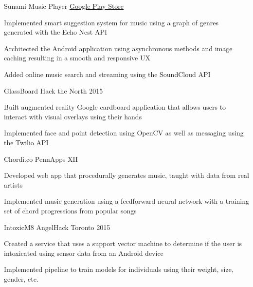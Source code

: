 \begin{cvprojects}
  \cvproject
    {Sunami Music Player}
    {\href{http://play.google.com/store/apps/details?id=com.wojtechnology.sunami}{Google Play Store}}
    {
      \begin{cvitems}
        \item Implemented smart suggestion system for music using a graph of genres generated with the Echo Nest API
        \item Architected the Android application using asynchronous methods and image caching resulting in a smooth and responsive UX
        \item Added online music search and streaming using the SoundCloud API
      \end{cvitems}
    }
  \cvproject
    {GlassBoard}
    {Hack the North 2015}
    {
      \begin{cvitems}
        \item Built augmented reality Google cardboard application that allows users to interact with visual overlays using their hands
        \item Implemented face and point detection using OpenCV as well as messaging using the Twilio API
      \end{cvitems}
    }
  \cvproject
    {Chordi.co}
    {PennApps XII}
    {
      \begin{cvitems}
        \item Developed web app that procedurally generates music, taught with data from real artists
        \item Implemented music generation using a feedforward neural network with a training set of chord progressions from popular songs
      \end{cvitems}
    }
  \cvproject
    {IntoxicM8}
    {AngelHack Toronto 2015}
    {
      \begin{cvitems}
        \item Created a service that uses a support vector machine to determine if the user is intoxicated using sensor data from an Android device
        \item Implemented pipeline to train models for individuals using their weight, size, gender, etc.
      \end{cvitems}
    }
\end{cvprojects}

